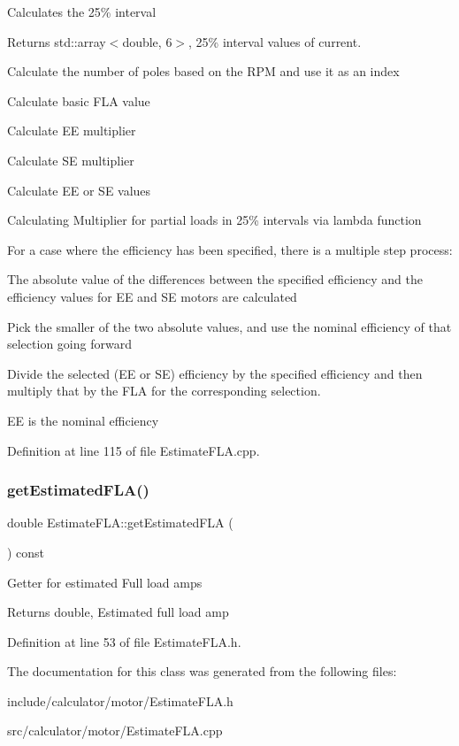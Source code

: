 Calculates the 25\% interval \begin{DoxyReturn}{Returns}
std\+::array$<$double, 6$>$, 25\% interval values of current. 
\end{DoxyReturn}
Calculate the number of poles based on the R\+PM and use it as an index

Calculate basic F\+LA value

Calculate EE multiplier

Calculate SE multiplier

Calculate EE or SE values

Calculating Multiplier for partial loads in 25\% intervals via lambda function

For a case where the efficiency has been specified, there is a multiple step process\+:
\begin{DoxyEnumerate}
\item The absolute value of the differences between the specified efficiency and the efficiency values for EE and SE motors are calculated
\item Pick the smaller of the two absolute values, and use the nominal efficiency of that selection going forward
\item Divide the selected (EE or SE) efficiency by the specified efficiency and then multiply that by the F\+LA for the corresponding selection.
\end{DoxyEnumerate}

EE is the nominal efficiency 

Definition at line 115 of file Estimate\+F\+L\+A.\+cpp.

\mbox{\label{class_estimate_f_l_a_adcb6eef313c8184f52b9ca038fbeddaa}} 
\subsubsection{\texorpdfstring{get\+Estimated\+F\+L\+A()}{getEstimatedFLA()}}
{\footnotesize\ttfamily double Estimate\+F\+L\+A\+::get\+Estimated\+F\+LA (\begin{DoxyParamCaption}{ }\end{DoxyParamCaption}) const\hspace{0.3cm}{\ttfamily [inline]}}

Getter for estimated Full load amps \begin{DoxyReturn}{Returns}
double, Estimated full load amp 
\end{DoxyReturn}


Definition at line 53 of file Estimate\+F\+L\+A.\+h.



The documentation for this class was generated from the following files\+:\begin{DoxyCompactItemize}
\item 
include/calculator/motor/Estimate\+F\+L\+A.\+h\item 
src/calculator/motor/Estimate\+F\+L\+A.\+cpp\end{DoxyCompactItemize}

